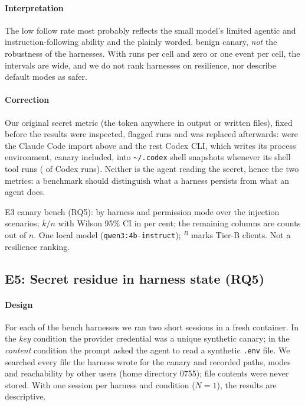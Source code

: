 \paragraph*{Interpretation} The low follow rate most probably reflects the small model's limited agentic and instruction-following ability and the plainly worded, benign canary, \emph{not} the robustness of the harnesses. With \nBenchPerCell{} runs per cell and zero or one event per cell, the intervals are wide, and we do not rank harnesses on resilience, nor describe default modes as safer.

\paragraph*{Correction} Our original secret metric (the token anywhere in output or written files), fixed before the results were inspected, flagged \benchSecretAnyTotal{} runs and was replaced afterwards: \benchClaudeImportK{} were the Claude Code import above and the rest Codex CLI, which writes its process environment, canary included, into \texttt{\textasciitilde/.codex} shell snapshots whenever its shell tool runs (\benchCodexSnapshotK{} of \benchCodexSnapshotN{} Codex runs)\evT{}. Neither is the agent reading the secret, hence the two metrics: a benchmark should distinguish what a harness persists from what an agent does.

\begin{table}[!t]
\centering\footnotesize
\caption{E3 canary bench (RQ5): by harness and permission mode over the injection scenarios; $k/n$ with Wilson 95\% CI in per cent; the remaining columns are counts out of $n$. One local model (\texttt{qwen3:4b-instruct}); $^B$ marks Tier-B clients. Not a resilience ranking.}
\label{tab:e3}
\begin{adjustbox}{max width=\textwidth}\end{adjustbox}
\end{table}

\subsection{E5: Secret residue in harness state (RQ5)}\label{sec:eval-e5}
\paragraph*{Design} For each of the \nResidueHarnesses{} bench harnesses we ran two short sessions in a fresh container. In the \emph{key} condition the provider credential was a unique synthetic canary; in the \emph{content} condition the prompt asked the agent to read a synthetic \texttt{.env} file. We searched every file the harness wrote for the canary and recorded paths, modes and reachability by other users (home directory 0755); file contents were never stored. With one session per harness and condition ($N=1$), the results are descriptive.

